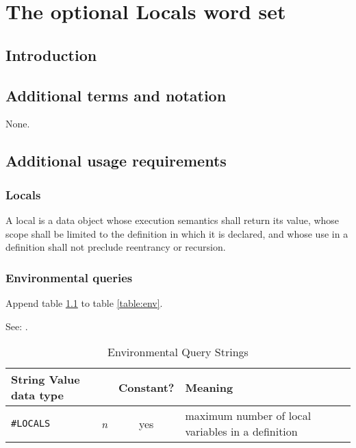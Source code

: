 
\chapter{The optional Locals word set} %

\section{Introduction} %
\label{locals:intro}

\section{Additional terms and notation} %

None.

\section{Additional usage requirements} %

\subsection{Locals} %

A local is a data object whose execution semantics shall return its
value, whose scope shall be limited to the definition in which it is
declared, and whose use in a definition shall not preclude reentrancy
or recursion.

\subsection{Environmental queries} %

Append table \ref{local:env} to table \ref{table:env}.

See: .

\begin{table}[h]
  \begin{center}
	\caption{Environmental Query Strings}
	\label{local:env}
	\begin{tabular}{p{9em}rcp{}}
		\hline\hline
		\multicolumn{2}{l}{String \hfill Value data type} & Constant? & Meaning \\
		\hline
		\texttt{\#LOCALS}		& \emph{n}	& yes
			& maximum number of local variables in a definition \\
		\hline\hline
	\end{tabular}
  \end{center}
\end{table}

